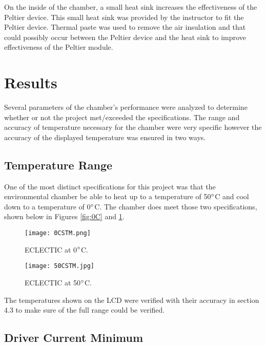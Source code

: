 \documentclass[11pt,letter]{article}
\begin{document}
On the inside of the chamber, a small heat sink increases the effectiveness of the Peltier device. This small heat sink was provided by the instructor to fit the Peltier device. Thermal paste was used to remove the air insulation and that could possibly occur between the Peltier device and the heat sink to improve effectiveness of the Peltier module.

\section{Results}

Several parameters of the chamber's performance were analyzed to determine whether or not the project met/exceeded the specifications. The range and accuracy of temperature necessary for the chamber were very specific however the accuracy of the displayed temperature was ensured in two ways. 

\subsection{Temperature Range}

One of the most distinct specifications for this project was that the environmental chamber be able to heat up to a temperature of 50$\degree$C and cool down to a temperature of 0$\degree$C. The chamber does meet those two specifications, shown below in Figures \ref{fig:0C} and \ref{fig:50C}. 

\begin{figure}[H]
    \centering
    \begin{minipage}{0.5\textwidth}
        \centering
        \texttt{[image: 0CSTM.png]} %
        \caption{ECLECTIC at 0$\degree$C.}
        \label{fig:0C}
    \end{minipage}\hfill
    \begin{minipage}{0.5\textwidth}
        \centering
        \texttt{[image: 50CSTM.jpg]} %
        \caption{ECLECTIC at 50$\degree$C.}
        \label{fig:50C}
    \end{minipage}
\end{figure}

The temperatures shown on the LCD were verified with their accuracy in section 4.3 to make sure of the full range could be verified.

\subsection{Driver Current Minimum}
\end{document}

